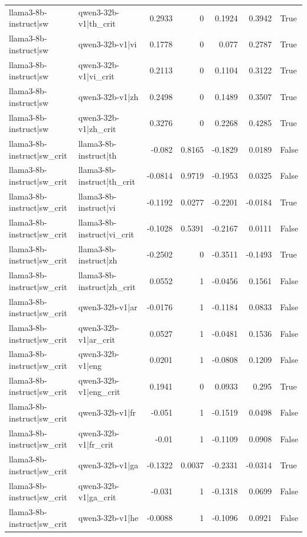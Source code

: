 \begin{table}
\begin{tabular}{l l r r r r l}
llama3-8b-instruct|sw & qwen3-32b-v1|th_crit & 0.2933 & 0 & 0.1924 & 0.3942 & True \\
llama3-8b-instruct|sw & qwen3-32b-v1|vi & 0.1778 & 0 & 0.077 & 0.2787 & True \\
llama3-8b-instruct|sw & qwen3-32b-v1|vi_crit & 0.2113 & 0 & 0.1104 & 0.3122 & True \\
llama3-8b-instruct|sw & qwen3-32b-v1|zh & 0.2498 & 0 & 0.1489 & 0.3507 & True \\
llama3-8b-instruct|sw & qwen3-32b-v1|zh_crit & 0.3276 & 0 & 0.2268 & 0.4285 & True \\
llama3-8b-instruct|sw_crit & llama3-8b-instruct|th & -0.082 & 0.8165 & -0.1829 & 0.0189 & False \\
llama3-8b-instruct|sw_crit & llama3-8b-instruct|th_crit & -0.0814 & 0.9719 & -0.1953 & 0.0325 & False \\
llama3-8b-instruct|sw_crit & llama3-8b-instruct|vi & -0.1192 & 0.0277 & -0.2201 & -0.0184 & True \\
llama3-8b-instruct|sw_crit & llama3-8b-instruct|vi_crit & -0.1028 & 0.5391 & -0.2167 & 0.0111 & False \\
llama3-8b-instruct|sw_crit & llama3-8b-instruct|zh & -0.2502 & 0 & -0.3511 & -0.1493 & True \\
llama3-8b-instruct|sw_crit & llama3-8b-instruct|zh_crit & 0.0552 & 1 & -0.0456 & 0.1561 & False \\
llama3-8b-instruct|sw_crit & qwen3-32b-v1|ar & -0.0176 & 1 & -0.1184 & 0.0833 & False \\
llama3-8b-instruct|sw_crit & qwen3-32b-v1|ar_crit & 0.0527 & 1 & -0.0481 & 0.1536 & False \\
llama3-8b-instruct|sw_crit & qwen3-32b-v1|eng & 0.0201 & 1 & -0.0808 & 0.1209 & False \\
llama3-8b-instruct|sw_crit & qwen3-32b-v1|eng_crit & 0.1941 & 0 & 0.0933 & 0.295 & True \\
llama3-8b-instruct|sw_crit & qwen3-32b-v1|fr & -0.051 & 1 & -0.1519 & 0.0498 & False \\
llama3-8b-instruct|sw_crit & qwen3-32b-v1|fr_crit & -0.01 & 1 & -0.1109 & 0.0908 & False \\
llama3-8b-instruct|sw_crit & qwen3-32b-v1|ga & -0.1322 & 0.0037 & -0.2331 & -0.0314 & True \\
llama3-8b-instruct|sw_crit & qwen3-32b-v1|ga_crit & -0.031 & 1 & -0.1318 & 0.0699 & False \\
llama3-8b-instruct|sw_crit & qwen3-32b-v1|he & -0.0088 & 1 & -0.1096 & 0.0921 & False \\

\end{tabular}
\end{table}
